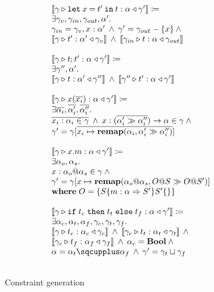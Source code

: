 \documentclass[preprint]{sigplanconf}
\newcommand{\remapapp}[3]{\ensuremath{\mathbf{remap}(#1, #2 \gg #3)}}
\newcommand{\inferrule}[4]{\left\llbracket #1 \triangleright #2 : #3 \triangleleft #4 \right\rrbracket}
\newcommand{\inferlhs}[1]{\left\llbracket \gamma \triangleright #1 : \alpha \triangleleft \gamma' \right\rrbracket}
\newcommand{\boolt}{\mathbf{Bool}}
\newcommand{\lett}[3]{\mathtt{let}\:#1\:\mathtt{=}\:#2\:\mathtt{in}\:#3}
\newcommand{\ift}[3]{\mathtt{if} \; #1 \; \mathtt{then} \; #2 \; \mathtt{else} \; #3}
\newcommand{\cand}{\:\wedge\:}
\begin{document}
\begin{figure}
\[\begin{array}{ll}
\inferlhs{\lett{x}{t'}{t}} \coloneqq \\
\exists \gamma_v, \gamma_{in}, \gamma_{out}, \alpha' . \\
\gamma_{in} = \gamma_v, x : \alpha'
\cand
\gamma' = \gamma_{out} - \{ x \}
\cand \\
\inferrule{\gamma}{t'}{\alpha'}{\gamma_v}
\cand
\inferrule{\gamma_{in}}{t}{\alpha}{\gamma_{out}}
\\\\

\inferlhs{t ; t'} \coloneqq \\
\exists \gamma'', \alpha' . \\
\inferrule{\gamma}{t}{\alpha'}{\gamma''}
\cand
\inferrule{\gamma''}{t'}{\alpha}{\gamma'}
\\\\

\inferlhs{x ( \overline{x_i} )} \coloneqq \\
\exists \overline{\alpha_i}, \overline{\alpha_i'}, \overline{\alpha_i''} . \\
\overline{x_i : \alpha_i \in \gamma}
\cand 
x : ( \overline{\alpha_i' \gg \alpha_i''} ) \rightarrow \alpha \in \gamma
\cand
\\
\gamma' = \gamma [ \overline{x_i \mapsto \remapapp{\alpha_i}{\alpha_i'}{\alpha_i''} } ]
\\\\

\inferlhs{x.m} \coloneqq \\
\exists \alpha_o, \alpha_s . \\
x : \alpha_o@\alpha_s \in \gamma
\cand \\
\gamma' = \gamma[ x \mapsto \remapapp{\alpha_o@\alpha_s}{O@S}{O@S'} ]
\\
\mathbf{where}\; O = \{ S \{ m : \alpha \Rightarrow S' \} S' \{ \} \}
\\\\

\inferlhs{\ift{t_c}{t_t}{t_f}} \coloneqq \\
\exists \alpha_c, \alpha_t, \alpha_f, \gamma_c, \gamma_t, \gamma_f . \\
\inferrule{\gamma}{t_c}{\alpha_c}{\gamma_c}
\cand
\inferrule{\gamma_c}{t_t}{\alpha_t}{\gamma_t}
\cand 
\\
\inferrule{\gamma_c}{t_f}{\alpha_f}{\gamma_f}
\cand
\alpha_c = \boolt
\cand
\\
\alpha = \alpha_t \sqcupplus \alpha_f
\cand
\gamma' = \gamma_t \sqcup \gamma_f
\\\\

\end{array}
\]
\caption{\label{fig:constraintgen} Constraint generation}
\end{figure}
\end{document}
